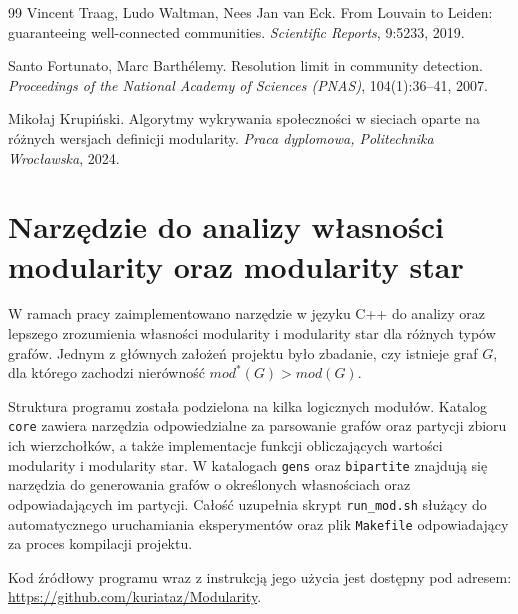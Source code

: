 \documentclass[letterpaper,12pt]{article}
\begin{document}
\begin{thebibliography}{99}
  Vincent Traag, Ludo Waltman, Nees Jan van Eck.
  \newblock From Louvain to Leiden: guaranteeing well-connected communities.
  \newblock \emph{Scientific Reports}, 9:5233, 2019.

  Santo Fortunato, Marc Barthélemy.
  \newblock Resolution limit in community detection.
  \newblock \emph{Proceedings of the National Academy of Sciences (PNAS)}, 104(1):36--41, 2007.

  Mikołaj Krupiński.
  \newblock Algorytmy wykrywania społeczności w sieciach oparte na różnych wersjach definicji modularity.
  \newblock \emph{Praca dyplomowa, Politechnika Wrocławska}, 2024.

\end{thebibliography}

\newpage
\section*{Narzędzie do analizy własności modularity oraz modularity star}
W ramach pracy zaimplementowano narzędzie w języku C++ do analizy oraz lepszego zrozumienia własności modularity i modularity star dla różnych typów grafów. Jednym z głównych założeń projektu było zbadanie, czy istnieje graf \(G\), dla którego zachodzi nierówność \(mod^*(G) > mod(G)\).

Struktura programu została podzielona na kilka logicznych modułów. Katalog \texttt{core} zawiera narzędzia odpowiedzialne za parsowanie grafów oraz partycji zbioru ich wierzchołków, a także implementacje funkcji obliczających wartości modularity i modularity star. W katalogach \texttt{gens} oraz \texttt{bipartite} znajdują się narzędzia do generowania grafów o określonych własnościach oraz odpowiadających im partycji. Całość uzupełnia skrypt \texttt{run\_mod.sh} służący do automatycznego uruchamiania eksperymentów oraz plik \texttt{Makefile} odpowiadający za proces kompilacji projektu.

Kod źródłowy programu wraz z instrukcją jego użycia jest dostępny pod adresem: \url{https://github.com/kuriataz/Modularity}.
\end{document}
